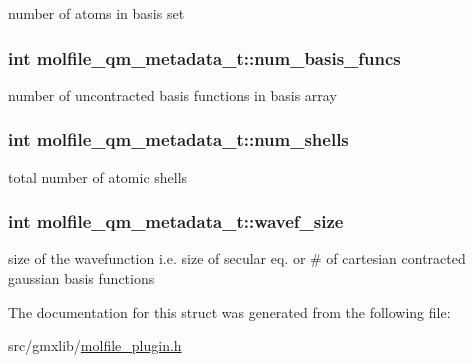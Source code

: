 number of atoms in basis set \hypertarget{structmolfile__qm__metadata__t_a38c4cd364a0fd01238688f31acb1ba51}{
\subsubsection[{num\-\_\-basis\-\_\-funcs}]{\setlength{\rightskip}{0pt plus 5cm}int {\bf molfile\-\_\-qm\-\_\-metadata\-\_\-t\-::num\-\_\-basis\-\_\-funcs}}}\label{structmolfile__qm__metadata__t_a38c4cd364a0fd01238688f31acb1ba51}
number of uncontracted basis functions in basis array \hypertarget{structmolfile__qm__metadata__t_ad8142f87b3b9459b1a5d43b1132b4525}{
\subsubsection[{num\-\_\-shells}]{\setlength{\rightskip}{0pt plus 5cm}int {\bf molfile\-\_\-qm\-\_\-metadata\-\_\-t\-::num\-\_\-shells}}}\label{structmolfile__qm__metadata__t_ad8142f87b3b9459b1a5d43b1132b4525}
total number of atomic shells \hypertarget{structmolfile__qm__metadata__t_a0e0ec769ad0c30a9e6360ba57322279b}{
\subsubsection[{wavef\-\_\-size}]{\setlength{\rightskip}{0pt plus 5cm}int {\bf molfile\-\_\-qm\-\_\-metadata\-\_\-t\-::wavef\-\_\-size}}}\label{structmolfile__qm__metadata__t_a0e0ec769ad0c30a9e6360ba57322279b}
size of the wavefunction i.\-e. size of secular eq. or \# of cartesian contracted gaussian basis functions 

\-The documentation for this struct was generated from the following file\-:\begin{DoxyCompactItemize}
\item 
src/gmxlib/\hyperlink{molfile__plugin_8h}{molfile\-\_\-plugin.\-h}\end{DoxyCompactItemize}
